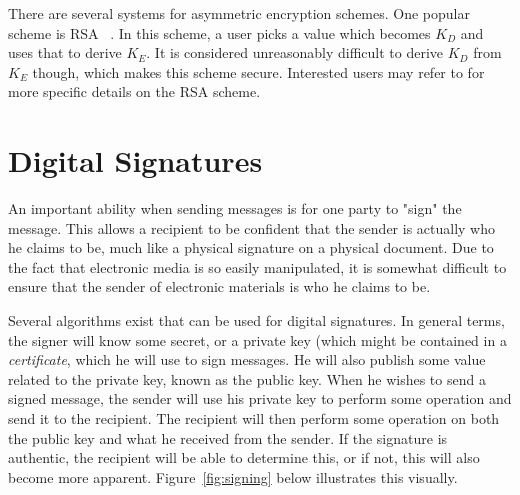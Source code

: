 There are several systems for asymmetric encryption schemes. One popular scheme is RSA ~\cite{RSA}. In this scheme, a user picks a value which becomes
$K_D$ and uses that to derive $K_E$. It is considered unreasonably difficult to derive $K_D$ from $K_E$ though, which makes this scheme secure.
Interested users may refer to \cite{RSA} for more specific details on the RSA scheme.


\section{Digital Signatures}
An important ability when sending messages is for one party to "sign" the message. This
allows a recipient to be confident that the sender is actually who he claims to be, much
like a physical signature on a physical document. Due to the fact that electronic media
is so easily manipulated, it is somewhat difficult to ensure that the sender of electronic
materials is who he claims to be.

Several algorithms exist that can be used for digital signatures. In general terms, the signer
will know some secret, or a private key (which might be contained in a \textit{certificate},
 which he will use to sign messages. He will
also publish some value related to the private key, known as the public key. When he wishes
to send a signed message, the sender will use his private key to perform some operation
and send it to the recipient. The recipient will then perform some operation on both
the public key and what he received from the sender. If the signature is authentic, the
recipient will be able to determine this, or if not, this will also become more apparent.
Figure~\ref{fig:signing} below illustrates this visually.

